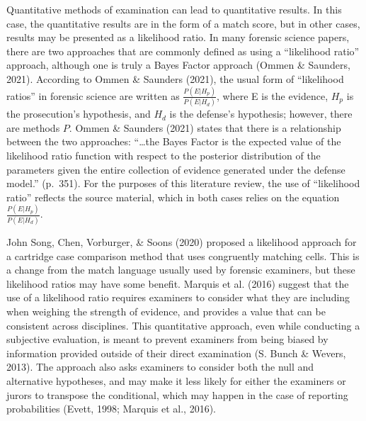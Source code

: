 \documentclass[print]{nuthesis}
\begin{document}
Quantitative methods of examination can lead to quantitative results.
In this case, the quantitative results are in the form of a match score, but in other cases, results may be presented as a likelihood ratio.
In many forensic science papers, there are two approaches that are commonly defined as using a ``likelihood ratio'' approach, although one is truly a Bayes Factor approach (Ommen \& Saunders, 2021).
According to Ommen \& Saunders (2021), the usual form of ``likelihood ratios'' in forensic science are written as \(\frac{P(E|H_p)}{P(E|H_d)}\), where E is the evidence, \(H_p\) is the prosecution's hypothesis, and \(H_d\) is the defense's hypothesis; however, there are  methods  \(P\).
Ommen \& Saunders (2021) states that there is a relationship between the two approaches: ``\ldots the Bayes Factor is the expected value of the likelihood ratio function with respect to the posterior distribution of the parameters given the entire collection of evidence generated under the defense model.'' (p.~351).
For the purposes of this literature review, the use of ``likelihood ratio'' reflects the source material, which in both cases relies on the equation \(\frac{P(E|H_p)}{P(E|H_d)}\).

John Song, Chen, Vorburger, \& Soons (2020) proposed a likelihood approach for a cartridge case comparison method that uses congruently matching cells.
This is a change from the match language usually used by forensic examiners, but these likelihood ratios may have some benefit.
Marquis et al. (2016) suggest that the use of a likelihood ratio requires examiners to consider what they are including when weighing the strength of evidence, and provides a value that can be consistent across disciplines.
This quantitative approach, even while conducting a subjective evaluation, is meant to prevent examiners from being biased by information provided outside of their direct examination (S. Bunch \& Wevers, 2013).
The approach also asks examiners to consider both the null and alternative hypotheses, and may make it less likely for either the examiners or jurors to transpose the conditional, which may happen in the case of reporting probabilities (Evett, 1998; Marquis et al., 2016).
\end{document}
